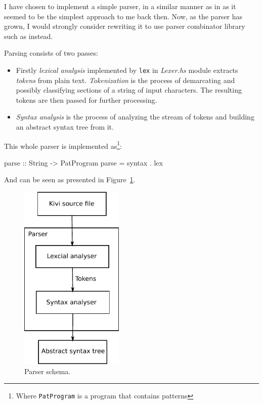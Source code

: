 \documentclass[12pt,a4paper]{report}
\begin{document}
I have chosen to implement a simple parser, in a similar manner as in
\cite{JonLes00} as it seemed to be the simplest approach to me back then. Now, as
the parser has grown, I would strongly consider rewriting it to use parser
combinator library such as \cite{website:parsec} instead.

Parsing consists of two passes:

\begin{itemize}
  \item Firstly \textit{lexical analysis} implemented by \texttt{lex} in
    \textit{Lexer.hs} module extracts \textit{tokens} from plain text.
    \textit{Tokenization} is the process of demarcating and possibly
    classifying sections of a string of input characters. The resulting tokens
    are then passed for further processing.
  \item \textit{Syntax analysis} is the process of analyzing the stream of
    tokens and building an abstract syntax tree from it.
\end{itemize}

This whole parser is implemented as\footnote{Where \texttt{PatProgram} is a
program that contains patterns}:

\vspace*{0.2in}
\begin{code}[style=haskell]
  parse :: String -> PatProgram
  parse = syntax . lex
\end{code}

And can be seen as presented in Figure~\ref{fig:parser}.

\vspace*{0.2in}
\begin{figure}[h!]
  \centering
  \includegraphics[height=9cm]{parser}
  \caption{Parser schema.}
  \label{fig:parser}
\end{figure}
\end{document}
